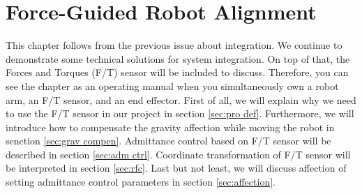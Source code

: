 \chapter{Force-Guided Robot Alignment}
\label{chapter4}
\hspace*{6mm}This chapter follows from the previous issue about integration. We continue to demonstrate some technical solutions for system integration. On top of that, the Forces and Torques (F/T) sensor will be included to discuss. Therefore, you can see the chapter as an operating manual when you simultaneously own a robot arm, an F/T sensor, and an end effector. First of all, we will explain why we need to use the F/T sensor in our project in section \ref{sec:pro def}. Furthermore, we will introduce how to compensate the gravity affection while moving the robot in senction \ref{sec:grav compen}. Admittance control based on F/T sensor will be described in section \ref{sec:adm ctrl}. Coordinate transformation of F/T sensor will be interpreted in section \ref{sec:rfc}. Last but not least, we will discuss affection of setting admittance control parameters in section \ref{sec:affection}.
